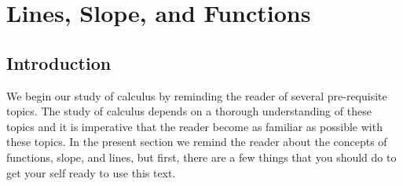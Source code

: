 \section{Lines, Slope, and Functions} \label{S:0.1.Functions}


\vspace*{-14 pt}


\nin \hrulefill



\subsection*{Introduction}
We begin our study of calculus by reminding the reader of several pre-requisite topics.
The study of calculus depends on a thorough understanding of these topics and it is
imperative that the reader become as familiar as possible with these topics.  In the
present section we remind the reader about the concepts of functions, slope, and lines,
but first, there are a few things that you should do to get your self ready to use this
text.



